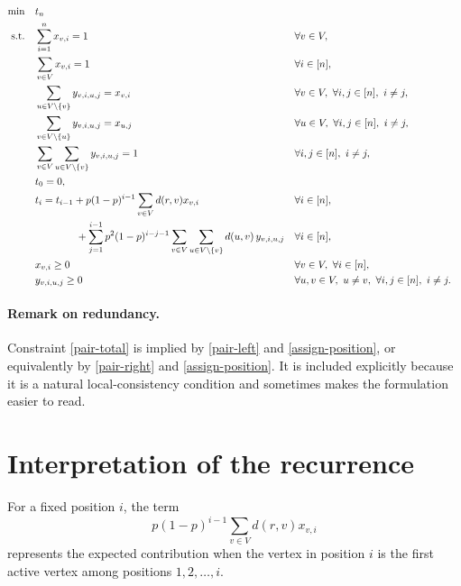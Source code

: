\documentclass[11pt]{article}
\begin{document}
\begin{alignat}{2}
\min \quad & t_n \label{obj}\\
\text{s.t.}\quad
& \sum_{i=1}^n x_{v,i} = 1 && \forall v \in V, \label{assign-vertex}\\
& \sum_{v \in V} x_{v,i} = 1 && \forall i \in [n], \label{assign-position}\\
& \sum_{u \in V \setminus \{v\}} y_{v,i,u,j} = x_{v,i} && \forall v \in V,\ \forall i,j \in [n],\ i \neq j, \label{pair-left}\\
& \sum_{v \in V \setminus \{u\}} y_{v,i,u,j} = x_{u,j} && \forall u \in V,\ \forall i,j \in [n],\ i \neq j, \label{pair-right}\\
& \sum_{v \in V} \sum_{u \in V \setminus \{v\}} y_{v,i,u,j} = 1 && \forall i,j \in [n],\ i \neq j, \label{pair-total}\\
& t_0 = 0, \label{t0}\\
& t_i = t_{i-1} + p(1-p)^{i-1}\sum_{v \in V} d(r,v)x_{v,i} 
   && \forall i \in [n], \label{ti-main}\\
& \hspace{4em} + \sum_{j=1}^{i-1} p^2(1-p)^{i-j-1}
   \sum_{v \in V}\sum_{u \in V \setminus \{v\}} d(u,v)\, y_{v,i,u,j}
   && \forall i \in [n], \notag\\
& x_{v,i} \ge 0 && \forall v \in V,\ \forall i \in [n], \label{xnonneg}\\
& y_{v,i,u,j} \ge 0 && \forall u,v \in V,\ u \neq v,\ \forall i,j \in [n],\ i \neq j. \label{ynonneg}
\end{alignat}

\paragraph{Remark on redundancy.}
Constraint \eqref{pair-total} is implied by \eqref{pair-left} and \eqref{assign-position}, or equivalently by \eqref{pair-right} and \eqref{assign-position}. It is included explicitly because it is a natural local-consistency condition and sometimes makes the formulation easier to read.

\section*{Interpretation of the recurrence}
For a fixed position $i$, the term
\[
p(1-p)^{i-1}\sum_{v \in V} d(r,v)x_{v,i}
\]
represents the expected contribution when the vertex in position $i$ is the first active vertex among positions $1,2,\dots,i$.
\end{document}
